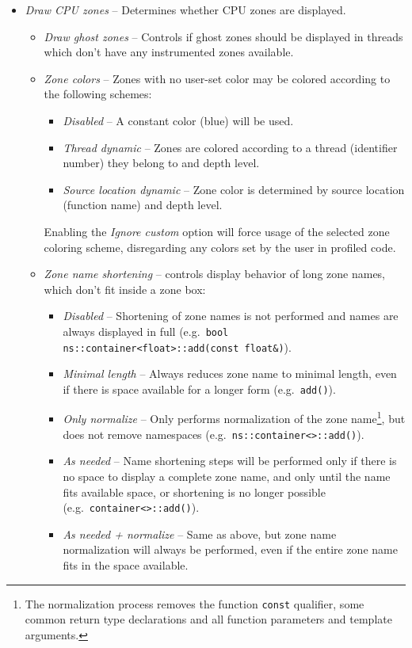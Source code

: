 \documentclass[hidelinks,titlepage,a4paper]{article}
\begin{document}
\begin{itemize}
\item \emph{\faMicrochip{} Draw CPU zones} -- Determines whether CPU zones are displayed.
\begin{itemize}
\item \emph{\faGhost{} Draw ghost zones} -- Controls if ghost zones should be displayed in threads which don't have any instrumented zones available.
\item \emph{\faPalette{} Zone colors} -- Zones with no user-set color may be colored according to the following schemes:
\begin{itemize}
\item \emph{Disabled} -- A constant color (blue) will be used.
\item \emph{Thread dynamic} -- Zones are colored according to a thread (identifier number) they belong to and depth level.
\item \emph{Source location dynamic} -- Zone color is determined by source location (function name) and depth level.
\end{itemize}
Enabling the \emph{Ignore custom} option will force usage of the selected zone coloring scheme, disregarding any colors set by the user in profiled code.
\item \emph{\faRulerHorizontal{} Zone name shortening} -- controls display behavior of long zone names, which don't fit inside a zone box:
\begin{itemize}
\item \emph{Disabled} -- Shortening of zone names is not performed and names are always displayed in full (e.g.\ \texttt{bool ns::container<float>::add(const float\&)}).
\item \emph{Minimal length} -- Always reduces zone name to minimal length, even if there is space available for a longer form (e.g.\ \texttt{add()}).
\item \emph{Only normalize} -- Only performs normalization of the zone name\footnote{The normalization process removes the function \texttt{const} qualifier, some common return type declarations and all function parameters and template arguments.}, but does not remove namespaces (e.g.\ \texttt{ns::container<>::add()}).
\item \emph{As needed} -- Name shortening steps will be performed only if there is no space to display a complete zone name, and only until the name fits available space, or shortening is no longer possible (e.g.\ \texttt{container<>::add()}).
\item \emph{As needed + normalize} -- Same as above, but zone name normalization will always be performed, even if the entire zone name fits in the space available.

\end{itemize}
\end{itemize}
\end{itemize}
\end{document}
